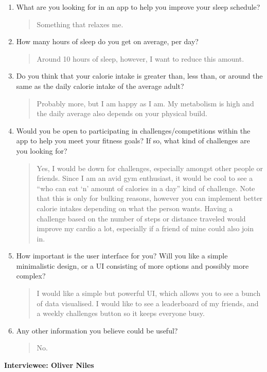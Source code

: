 \documentclass[11pt]{article}
\begin{document}
\begin{enumerate}[label=\textbf{Q\arabic*:}, leftmargin=*, align=left]
    \item What are you looking for in an app to help you improve your sleep schedule?
    \begin{quote}
        Something that relaxes me.
    \end{quote}

    \item How many hours of sleep do you get on average, per day?
    \begin{quote}
        Around 10 hours of sleep, however, I want to reduce this amount.
    \end{quote}

    \item Do you think that your calorie intake is greater than, less than, or around the same as the daily calorie intake of the average adult?
    \begin{quote}
        Probably more, but I am happy as I am. My metabolism is high and the daily average also depends on your physical build.
    \end{quote}

    \item Would you be open to participating in challenges/competitions within the app to help you meet your fitness goals? If so, what kind of challenges are you looking for?
    \begin{quote}
        Yes, I would be down for challenges, especially amongst other people or friends. Since I am an avid gym enthusiast, it would be cool to see a “who can eat ‘n’ amount of calories in a day” kind of challenge. Note that this is only for bulking reasons, however you can implement better calorie intakes depending on what the person wants. Having a challenge based on the number of steps or distance traveled would improve my cardio a lot, especially if a friend of mine could also join in.
    \end{quote}

    \item How important is the user interface for you? Will you like a simple minimalistic design, or a UI consisting of more options and possibly more complex?
    \begin{quote}
        I would like a simple but powerful UI, which allows you to see a bunch of data visualised. I would like to see a leaderboard of my friends, and a weekly challenges button so it keeps everyone busy.
    \end{quote}

    \item Any other information you believe could be useful?
    \begin{quote}
        No.
    \end{quote}
\end{enumerate}
\newpage
\textbf{Interviewee: Oliver Niles}
\end{document}
